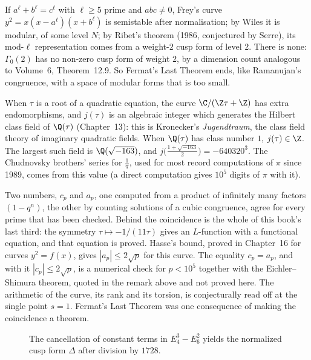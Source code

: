 \begin{remark}
If $a^\ell+b^\ell=c^\ell$ with $\ell\ge5$ prime and $abc\ne0$, Frey's curve $y^2=x(x-a^\ell)(x+b^\ell)$ is semistable after normalisation; by Wiles it is modular, of some level $N$;
by Ribet's theorem (1986, conjectured by Serre), its mod-$\ell$ representation comes from a weight-$2$ cusp form of level $2$. There is none: $\Gamma_0(2)$ has no non-zero cusp
form of weight $2$, by a dimension count analogous to Volume~6, Theorem~12.9. So Fermat's Last Theorem ends, like Ramanujan's congruence, with a space of modular forms
that is too small.
\end{remark}

\begin{remark}\label{rem:cm}
When $\tau$ is a root of a quadratic equation, the curve $\C/(\Z\tau+\Z)$ has extra endomorphisms, and $j(\tau)$ is an algebraic integer which generates the Hilbert
class field of $\Q(\tau)$ (Chapter~13): this is Kronecker's \emph{Jugendtraum}, the class field theory of imaginary quadratic fields. When $\Q(\tau)$ has class number $1$,
$j(\tau)\in\Z$. The largest such field is $\Q(\sqrt{-163})$, and $j\bigl(\frac{1+\sqrt{-163}}2\bigr)=-640320^3$. The Chudnovsky brothers' series for $\frac1\pi$, used for
most record computations of $\pi$ since 1989, comes from this value (a direct computation gives $10^5$ digits of $\pi$ with it).
\end{remark}

\begin{beauty}
Two numbers, $c_p$ and $a_p$, one computed from a product of infinitely many factors $(1-q^n)$, the other by counting solutions of a cubic congruence, agree for every
prime that has been checked. Behind the coincidence is the whole of this book's last third: the symmetry $\tau\mapsto-1/(11\tau)$ gives an $L$-function with a functional equation, and that equation is proved. Hasse's bound, proved in Chapter~16 for curves $y^2=f(x)$, gives $|a_p|\le2\sqrt p$ for this curve. The equality $c_p=a_p$, and with it $|c_p|\le2\sqrt p$, is a numerical check for $p<10^5$ together with the Eichler--Shimura theorem, quoted in the remark above and not proved here. The arithmetic of the curve, its rank and its torsion, is conjecturally read off at the single point
$s=1$. Fermat's Last Theorem was one consequence of making the coincidence a theorem.
\end{beauty}

\begin{figure}[ht]
\centering
{}
\caption{The cancellation of constant terms in $E_4^3-E_6^2$ yields the normalized cusp form $\Delta$ after division by $1728$.}
\label{fig:v13-extra-17-a}
\end{figure}

